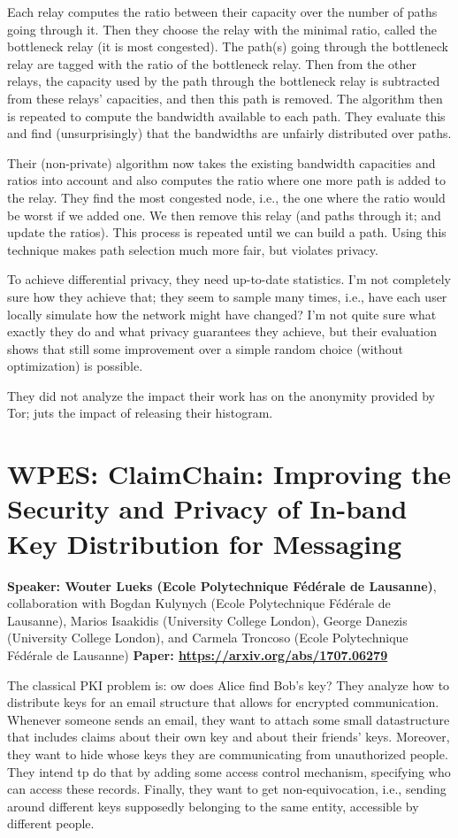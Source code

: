 \documentclass{article}
\begin{document}
Each relay computes the ratio between their capacity over the number of paths going through it. Then they choose the relay with the minimal ratio, called the bottleneck relay (it is most congested). The path(s) going through the bottleneck relay are tagged with the ratio of the bottleneck relay. Then from the other relays, the capacity used by the path through the bottleneck relay is subtracted from these relays' capacities, and then this path is removed. The algorithm then is repeated to compute the bandwidth available to each path. They evaluate this and find (unsurprisingly) that the bandwidths are unfairly distributed over paths.

Their (non-private) algorithm now takes the existing bandwidth capacities and ratios into account and also computes the ratio where one more path is added to the relay. They find the most congested node, i.e., the one where the ratio would be worst if we added one. We then remove this relay (and paths through it; and update the ratios). This process is repeated until we can build a path. Using this technique makes path selection much more fair, but violates privacy.

To achieve differential privacy, they need up-to-date statistics. I'm not completely sure how they achieve that; they seem to sample many times, i.e., have each user locally simulate how the network might have changed? I'm not quite sure what exactly they do and what privacy guarantees they achieve, but their evaluation shows that still some improvement over a simple random choice (without optimization) is possible.

They did not analyze the impact their work has on the anonymity provided by Tor; juts the impact of releasing their histogram.


\section{WPES: ClaimChain: Improving the Security and Privacy of In-band Key Distribution for Messaging}
\noindent\textbf{Speaker: Wouter Lueks (Ecole Polytechnique Fédérale de Lausanne)}, collaboration with Bogdan Kulynych (Ecole Polytechnique Fédérale de Lausanne), Marios Isaakidis (University College London), George Danezis (University College London), and Carmela Troncoso (Ecole Polytechnique Fédérale de Lausanne) 
\noindent\textbf{Paper: \url{https://arxiv.org/abs/1707.06279}}

The classical PKI problem is: ow does Alice find Bob's key?
They analyze how to distribute keys for an email structure that allows for encrypted communication. Whenever someone sends an email, they want to attach some small datastructure that includes claims about their own key and about their friends' keys. Moreover, they want to hide whose keys they are communicating from unauthorized people. They intend tp do that by adding some access control mechanism, specifying who can access these records. Finally, they want to get non-equivocation, i.e., sending around different keys supposedly belonging to the same entity, accessible by different people.
\end{document}
